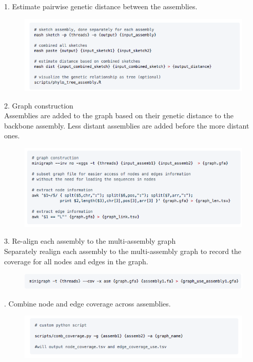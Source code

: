 \documentclass[../main.tex]{subfiles}
\begin{document}
\begin{flushleft}
1. Estimate pairwise genetic distance between the assemblies. \\
    \begin{figure}[!htb]
        \centering
        \includegraphics[width=\textwidth]{paper3/supplement/sp421.png}
    \end{figure}
2. Graph construction \\ Assemblies are added to the graph based on their genetic distance to the backbone assembly. Less distant assemblies are added before the more distant ones. \\
    \begin{figure}[!htb]
        \centering
        \includegraphics[width=\textwidth]{paper3/supplement/sp422.png}
    \end{figure}
3. Re-align each assembly to the multi-assembly graph \\ Separately realign each assembly to the multi-assembly graph to record the coverage for all nodes and edges in the graph. \\ 
    \begin{figure}[!htb]
        \centering
        \includegraphics[width=\textwidth]{paper3/supplement/sp423.png}
    \end{figure}
    . Combine node and edge coverage across assemblies. \\
    \begin{figure}[!htb]
        \centering
        \includegraphics[width=\textwidth]{paper3/supplement/sp424.png}

\end{figure}
\end{flushleft}
\end{document}
